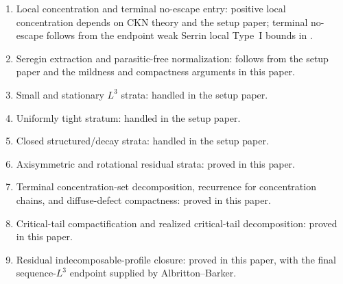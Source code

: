 \documentclass[11pt]{amsart}
\numberwithin{equation}{section}
\theoremstyle{plain}
\theoremstyle{definition}
\theoremstyle{remark}
\begin{document}
\begin{enumerate}[label=\textup{(\arabic*)},leftmargin=2.2em]
   \item Local concentration and terminal no-escape entry: positive local
   concentration depends on CKN theory and the setup paper; terminal no-escape follows
   from the endpoint weak Serrin local Type~I bounds in
   .
   \item Seregin extraction and parasitic-free normalization: follows from
   the setup paper and the mildness and compactness arguments in this paper.
   \item Small and stationary \(L^3\) strata: handled in the setup paper.
   \item Uniformly tight stratum: handled in the setup paper.
   \item Closed structured/decay strata: handled in the setup paper.
   \item Axisymmetric and rotational residual strata: proved in this paper.
   \item Terminal concentration-set decomposition, recurrence for concentration chains, and
   diffuse-defect compactness: proved in this paper.
   \item Critical-tail compactification and realized critical-tail
   decomposition: proved in this paper.
   \item Residual indecomposable-profile closure: proved in this paper, with
   the final sequence-\(L^3\) endpoint supplied by Albritton--Barker.
\end{enumerate}
\end{document}
